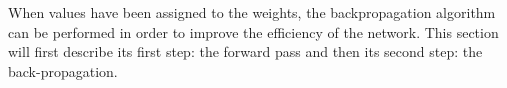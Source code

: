 When values have been assigned to the weights, the backpropagation algorithm can be performed in order to improve the efficiency of the network. This section will first describe its first step: the forward pass and then its second step: the back-propagation.
%

%

%
%
